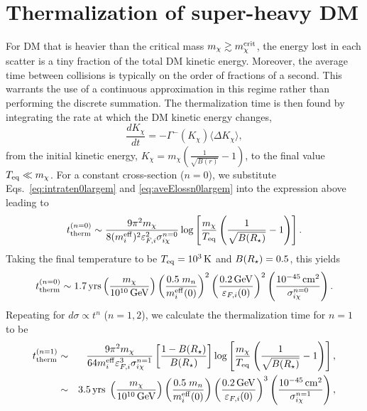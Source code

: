 \section{Thermalization of super-heavy DM}
\label{app:sec:thermsuperheavy}



For DM that is heavier than the critical mass  $m_\chi\gtrsim m_\chi^{\rm crit}$,
the energy lost in each scatter is a tiny fraction of the total DM kinetic energy. Moreover, the average time between collisions is typically on the order of fractions of a second. This warrants the use of a continuous approximation in this regime rather than performing the discrete summation. The thermalization time is then found by integrating the rate at which the DM kinetic energy changes, 
\begin{equation}
    \frac{dK_\chi}{dt} = -\Gamma^{-}(K_\chi) \langle\Delta K_\chi\rangle,  
    \label{app:eq:contttherm}
\end{equation}
from the initial kinetic energy, $K_\chi=m_\chi\left(\frac{1}{\sqrt{B(r)}}-1\right)$, to the final value $T_{\rm eq}\ll m_\chi$. For a constant cross-section ($n=0$), we substitute  Eqs.~\ref{eq:intraten0largem} and \ref{eq:aveElossn0largem} into the expression above leading to
\begin{equation}
    t_{\rm therm}^{(n=0)} \sim \frac{9 \pi^2 m_\chi}{8 (m_i^{\rm eff})^2 \varepsilon_{F,i}^2 \sigma_{i\chi}^{n=0}}\log\left[\frac{m_\chi}{T_{\rm eq}}\left(\frac{1}{\sqrt{B(R_\star)}}-1\right)\right].
    \label{app:eq:tthemheavy0}
\end{equation}
Taking the final temperature to be $T_{\rm eq}=10^3{\rm \,K}$ and $B(R_\star)=0.5$, this yields 
\begin{equation}
    t_{\rm therm}^{(n=0)} \sim 1.7  {\rm \,yrs} \left(\frac{m_\chi }{10^{10}{\rm \,GeV}}\right)\left(\frac{0.5\;m_n}{m_i^{\rm eff}(0)}\right)^{2}\left(\frac{0.2{\rm \,GeV}}{\varepsilon_{F,i}(0)}\right)^{2}\left(\frac{10^{-45}{\rm \,cm}^2}{\sigma_{i\chi}^{n=0}}\right).    
\end{equation}
%
Repeating for $d\sigma\propto t^n$ ($n=1,2$), we calculate the thermalization time for $n=1$ to be
\begin{eqnarray}
    t_{\rm therm}^{(n=1)} &\sim& \frac{9\pi^2 m_\chi}{ 64 m_i^{\rm eff} \varepsilon_{F,i}^3 \sigma_{i\chi}^{n=1}}\left[\frac{1-B(R_\star)}{B(R_\star)}\right] \log\left[\frac{m_\chi}{T_{\rm eq}} \left(\frac{1}{\sqrt{B(R_\star)}}-1\right)\right],\\
    &\sim& 3.5 {\rm \,yrs}\; \left(\frac{m_\chi}{10^{10} {\rm \,GeV}}\right)\left(\frac{0.5\;m_n}{m_i^{\rm eff}(0)}\right) \left(\frac{0.2{\rm \,GeV}}{\varepsilon_{F,i}(0)}\right)^{3}\left(\frac{10^{-45}{\rm \,cm}^2}{\sigma_{i\chi}^{n=1}}\right),
\end{eqnarray}
